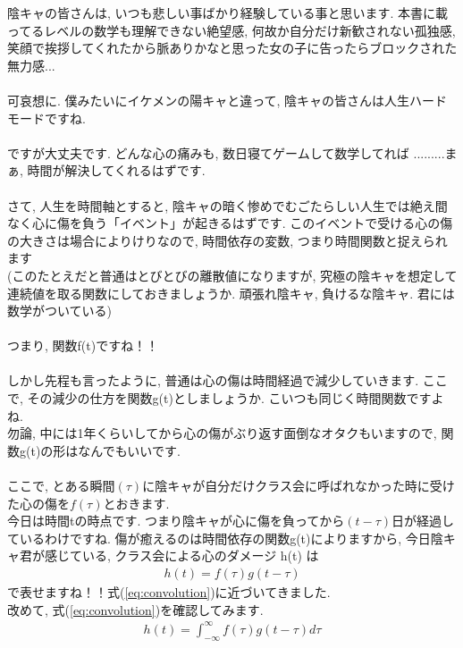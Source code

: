 \documentclass[11pt,a4paper]{jreport}
\begin{document}
陰キャの皆さんは, いつも悲しい事ばかり経験している事と思います. 本書に載ってるレベルの数学も理解できない絶望感, 何故か自分だけ新歓されない孤独感, 笑顔で挨拶してくれたから脈ありかなと思った女の子に告ったらブロックされた無力感...\\
\\
可哀想に. 僕みたいにイケメンの陽キャと違って, 陰キャの皆さんは人生ハードモードですね.\\
\\
ですが大丈夫です. どんな心の痛みも, 数日寝てゲームして数学してれば
.........まぁ, 時間が解決してくれるはずです. \\
\\
さて, 人生を時間軸とすると, 陰キャの暗く惨めでむごたらしい人生では絶え間なく心に傷を負う「イベント」が起きるはずです. このイベントで受ける心の傷の大きさは場合によりけりなので, 時間依存の変数, つまり時間関数と捉えられます\\
(このたとえだと普通はとびとびの離散値になりますが, 究極の陰キャを想定して連続値を取る関数にしておきましょうか. 頑張れ陰キャ, 負けるな陰キャ. 君には数学がついている)\\
\\
つまり, 関数f(t)ですね！！\\
\\
しかし先程も言ったように, 普通は心の傷は時間経過で減少していきます. ここで, その減少の仕方を関数g(t)としましょうか. こいつも同じく時間関数ですよね.\\
勿論, 中には1年くらいしてから心の傷がぶり返す面倒なオタクもいますので, 関数g(t)の形はなんでもいいです.\\
\\
ここで, とある瞬間$(\tau)$に陰キャが自分だけクラス会に呼ばれなかった時に受けた心の傷を$f(\tau)$とおきます.\\
今日は時間tの時点です. つまり陰キャが心に傷を負ってから$(t-\tau)$日が経過しているわけですね. 傷が癒えるのは時間依存の関数g(t)によりますから, 今日陰キャ君が感じている, クラス会による心のダメージ h(t) は
\begin{eqnarray}
\label{eq:inkya_otu}
h(t) = f(\tau) g(t-\tau)
\end{eqnarray}
で表せますね！！式(\ref{eq:convolution})に近づいてきました. \\
改めて, 式(\ref{eq:convolution})を確認してみます.
\begin{eqnarray}
h(t) = \int^{\infty}_{-\infty} f(\tau) g(t - \tau) d\tau
\end{eqnarray}
\end{document}
